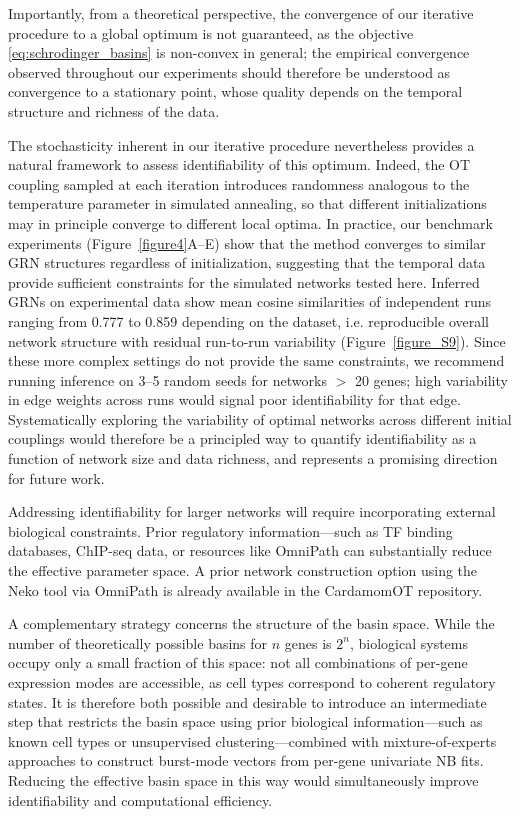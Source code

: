\documentclass[a4paper, 11pt]{article}
\theoremstyle{plain}
\theoremstyle{remark}
\newcommand*{\firstreview}[1]{{\color{black}#1}}
\begin{document}
Importantly, from a theoretical perspective, the convergence of our 
iterative procedure to a global optimum is not guaranteed, as the 
objective \eqref{eq:schrodinger_basins} is non-convex in general; 
the empirical convergence observed throughout our experiments should 
therefore be understood as convergence to a stationary point, whose 
quality depends on the temporal structure and richness of the data.

The stochasticity inherent in our iterative procedure nevertheless provides a natural framework to assess identifiability of this optimum. Indeed, the OT coupling sampled at each iteration introduces randomness analogous to the temperature parameter in simulated annealing, so that different initializations may in principle converge to different local optima. In practice, our benchmark experiments (Figure~\ref{figure4}A--E) show that the method converges to similar GRN structures regardless of initialization, suggesting that the temporal data provide sufficient constraints for the simulated networks tested here. \firstreview{Inferred GRNs on experimental data show mean cosine similarities of independent runs ranging from 0.777 to 0.859 depending on the dataset, i.e. reproducible overall network structure with residual run-to-run variability (Figure~\ref{figure_S9}). Since these more complex
settings do not provide the same constraints, we recommend running inference on 3--5 random
seeds for networks $>$ 20 genes; high variability in edge weights across runs would signal poor
identifiability for that edge.} Systematically exploring the variability of optimal networks across different initial couplings would therefore be a principled way to quantify identifiability as a function of network size and data richness, and represents a promising direction for future work.

Addressing identifiability for larger networks will require incorporating external biological constraints. Prior regulatory information—such as \firstreview{TF} binding databases, ChIP-seq data, or resources like OmniPath \cite{turei2016omnipath} can substantially reduce the effective parameter space. A prior network construction option using the Neko tool \cite{ruscone2025neko} via OmniPath is already available in the CardamomOT repository.

A complementary strategy concerns the structure of the basin space. While the number of theoretically possible basins for $n$ genes is $2^n$, biological systems occupy only a small fraction of this space: not all combinations of per-gene expression modes are accessible, as cell types correspond to coherent regulatory states. It is therefore both possible and desirable to introduce an intermediate step that restricts the basin space using prior biological information—such as known cell types or unsupervised clustering—combined with mixture-of-experts approaches to construct burst-mode vectors from per-gene univariate NB fits. Reducing the effective basin space in this way would simultaneously improve identifiability and computational efficiency.
\end{document}
